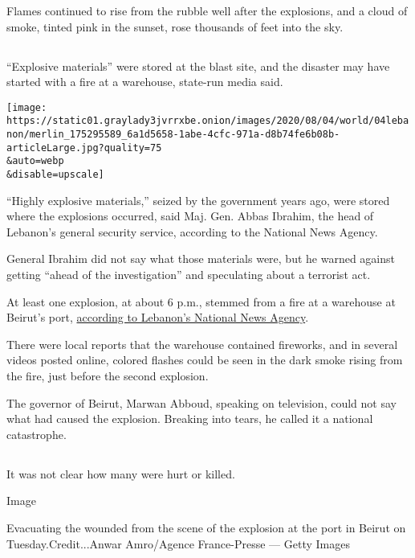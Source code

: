 Flames continued to rise from the rubble well after the explosions, and
a cloud of smoke, tinted pink in the sunset, rose thousands of feet into
the sky.

\hypertarget{-1}{%
\subsection{}\label{-1}}

``Explosive materials'' were stored at the blast site, and the disaster
may have started with a fire at a warehouse, state-run media said.

\texttt{[image: https://static01.graylady3jvrrxbe.onion/images/2020/08/04/world/04lebanon/merlin\_175295589\_6a1d5658-1abe-4cfc-971a-d8b74fe6b08b-articleLarge.jpg?quality=75\\\&auto=webp\\\&disable=upscale]}

``Highly explosive materials,'' seized by the government years ago, were
stored where the explosions occurred, said Maj. Gen. Abbas Ibrahim, the
head of Lebanon's general security service, according to the National
News Agency.

General Ibrahim did not say what those materials were, but he warned
against getting ``ahead of the investigation'' and speculating about a
terrorist act.

At least one explosion, at about 6 p.m., stemmed from a fire at a
warehouse at Beirut's port,
\href{http://nna-leb.gov.lb/en/show-news/118492/Fire-breaks-out-in-warehouse-at-Port-of-Beirut-causes-major-explosion}{according
to Lebanon's National News Agency}.

There were local reports that the warehouse contained fireworks, and in
several videos posted online, colored flashes could be seen in the dark
smoke rising from the fire, just before the second explosion.

The governor of Beirut, Marwan Abboud, speaking on television, could not
say what had caused the explosion. Breaking into tears, he called it a
national catastrophe.

\hypertarget{-2}{%
\subsection{}\label{-2}}

It was not clear how many were hurt or killed.

Image

Evacuating the wounded from the scene of the explosion at the port in
Beirut on Tuesday.Credit...Anwar Amro/Agence France-Presse --- Getty
Images

